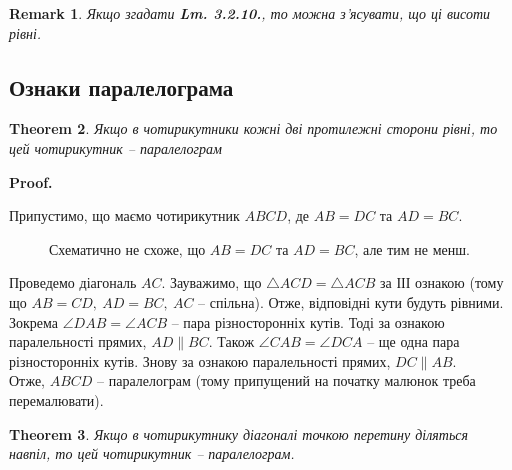 \documentclass[a4paper, 10pt]{article}
\makeatletter
\theoremstyle{theoremdd}
\newtheorem{theorem}{Theorem}[subsection]
\theoremstyle{theoremdd}
\theoremstyle{theoremdd}
\theoremstyle{theoremdd}
\theoremstyle{theoremdd}
\theoremstyle{theoremdd}
\theoremstyle{theoremdd}
\newtheorem{remark}[theorem]{Remark}
\theoremstyle{theoremdd}
\theoremstyle{theoremdd}
\renewenvironment{proof}[1][Proof.\\]{\par
\pushQED{\hfill \qed}%
\normalfont \topsep6\p@\@plus6\p@\relax
\trivlist
\item\relax
{\bfseries
#1\@addpunct{.}}\hspace\labelsep\ignorespaces
}{%
\popQED\endtrivlist\@endpefalse
}
\makeatother
\begin{document}
\begin{remark}
Якщо згадати \textbf{Lm. 3.2.10.}, то можна з'ясувати, що ці висоти рівні.
\end{remark}

\subsection{Ознаки паралелограма}
\begin{theorem}
Якщо в чотирикутники кожні дві протилежні сторони рівні, то цей чотирикутник -- паралелограм
\end{theorem}

\begin{proof}
Припустимо, що маємо чотирикутник $ABCD$, де $AB = DC$ та $AD = BC$.
\begin{figure}[H]
\centering
{}
\caption*{Схематично не схоже, що $AB = DC$ та $AD = BC$, але тим не менш.}
\end{figure}
Проведемо діагональ $AC$. Зауважимо, що $\triangle ACD = \triangle ACB$ за ІІІ ознакою (тому що $AB = CD,\ AD = BC,\ AC$ -- спільна). Отже, відповідні кути будуть рівними. Зокрема $\angle DAB = \angle ACB$ -- пара різносторонніх кутів. Тоді за ознакою паралельності прямих, $AD \parallel BC$. Також $\angle CAB = \angle DCA$ -- ще одна пара різносторонніх кутів. Знову за ознакою паралельності прямих, $DC \parallel AB$.\\
Отже, $ABCD$ -- паралелограм (тому припущений на початку малюнок треба перемалювати).
\end{proof}

\begin{theorem}
Якщо в чотирикутнику діагоналі точкою перетину діляться навпіл, то цей чотирикутник -- паралелограм.
\end{theorem}
\end{document}

